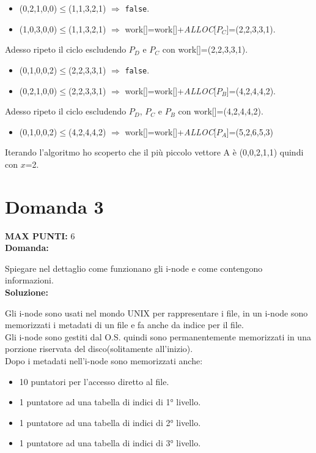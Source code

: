 \documentclass{article}
\begin{document}
\begin{itemize}
\begin{itemize}
            \item (0,2,1,0,0)$\le$(1,1,3,2,1) $\Rightarrow$ \verb+false+.
            \item (1,0,3,0,0)$\le$(1,1,3,2,1) \checkmark $\Rightarrow$ work[]=work[]+\emph{ALLOC}[$P_C$]=(2,2,3,3,1).
        \end{itemize}
        Adesso ripeto il ciclo escludendo $P_D$ e $P_C$ con work[]=(2,2,3,3,1).
        \begin{itemize}
            \item (0,1,0,0,2)$\le$(2,2,3,3,1) $\Rightarrow$ \verb+false+.
            \item (0,2,1,0,0)$\le$(2,2,3,3,1) \checkmark $\Rightarrow$ work[]=work[]+\emph{ALLOC}[$P_B$]=(4,2,4,4,2).
        \end{itemize}
        Adesso ripeto il ciclo escludendo $P_D$, $P_C$ e $P_B$ con work[]=(4,2,4,4,2).
        \begin{itemize}
            \item (0,1,0,0,2)$\le$(4,2,4,4,2) \checkmark $\Rightarrow$ work[]=work[]+\emph{ALLOC}[$P_A$]=(5,2,6,5,3)
        \end{itemize}
    \end{itemize}
    Iterando l'algoritmo ho scoperto che il più piccolo vettore A è (0,0,2,1,1) quindi con $x$=2.
    \section*{Domanda 3}
    \textbf{MAX PUNTI:} 6\\
    \textbf{Domanda:}


    Spiegare nel dettaglio come funzionano gli i-node e come contengono informazioni.\\
    \textbf{Soluzione:}


    Gli i-node sono usati nel mondo UNIX per rappresentare i file, in un i-node sono memorizzati i metadati di un file e fa anche da indice per il file.\\
    Gli i-node sono gestiti dal O.S. quindi sono permanentemente memorizzati in una porzione riservata del disco(solitamente all'inizio).\\
    Dopo i metadati nell'i-node sono memorizzati anche:
    \begin{itemize}
        \item 10 puntatori per l'accesso diretto al file.
        \item 1 puntatore ad una tabella di indici di 1° livello.
        \item 1 puntatore ad una tabella di indici di 2° livello.
        \item 1 puntatore ad una tabella di indici di 3° livello.
    \end{itemize}
\end{document}
